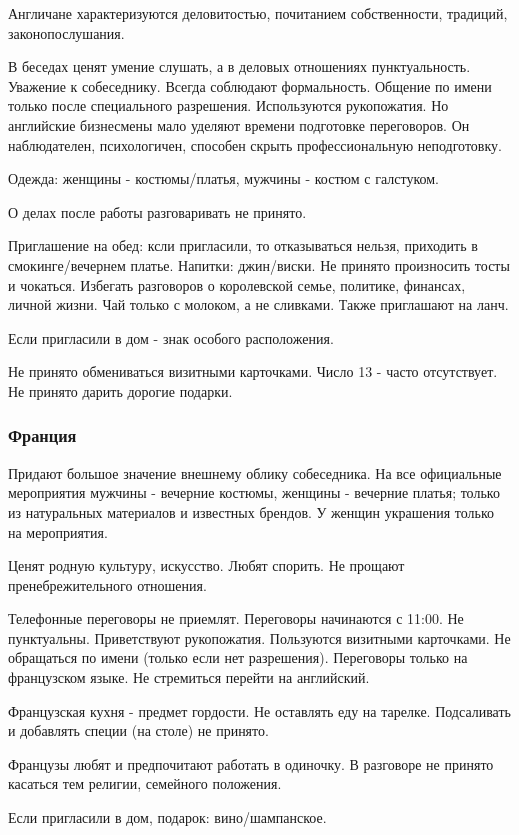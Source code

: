 \documentclass[a4paper,14pt]{extarticle}
\begin{document}
Англичане характеризуются деловитостью, почитанием собственности, традиций, законопослушания.

В беседах ценят умение слушать, а в деловых отношениях пунктуальность. Уважение к собеседнику. Всегда соблюдают формальность. Общение по имени только после специального разрешения. Используются рукопожатия. Но английские бизнесмены мало уделяют времени подготовке переговоров. Он наблюдателен, психологичен, способен скрыть профессиональную неподготовку.

Одежда: женщины - костюмы/платья, мужчины - костюм с галстуком.

О делах после работы разговаривать не принято.

Приглашение на обед: ксли пригласили, то отказываться нельзя, приходить в смокинге/вечернем платье. Напитки: джин/виски. Не принято произносить тосты и чокаться. Избегать разговоров о королевской семье, политике, финансах, личной жизни. Чай только с молоком, а не сливками. Также приглашают на ланч.

Если пригласили в дом - знак особого расположения.

Не принято обмениваться визитными карточками. Число 13 - часто отсутствует. Не принято дарить дорогие подарки.

\subsubsection{Франция}

Придают большое значение внешнему облику собеседника. На все официальные мероприятия мужчины - вечерние костюмы, женщины - вечерние платья; только из натуральных материалов и известных брендов. У женщин украшения только на мероприятия.

Ценят родную культуру, искусство. Любят спорить. Не прощают пренебрежительного отношения.

Телефонные переговоры не приемлят. Переговоры начинаются с 11:00. Не пунктуальны. Приветствуют рукопожатия. Пользуются визитными карточками. Не обращаться по имени (только если нет разрешения). Переговоры только на французском языке. Не стремиться перейти на английский.

Французская кухня - предмет гордости. Не оставлять еду на тарелке.
Подсаливать и добавлять специи (на столе) не принято.

Французы любят и предпочитают работать в одиночку. В разговоре не
принято касаться тем религии, семейного положения.

Если пригласили в дом, подарок: вино/шампанское.
\end{document}
